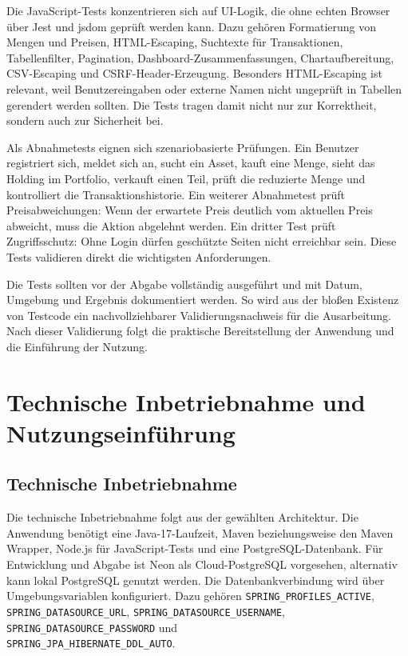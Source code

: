 \documentclass[12pt,a4paper]{article}
\begin{document}
Die JavaScript-Tests konzentrieren sich auf UI-Logik, die ohne echten Browser über Jest und jsdom geprüft werden kann. Dazu gehören Formatierung von Mengen und Preisen, HTML-Escaping, Suchtexte für Transaktionen, Tabellenfilter, Pagination, Dashboard-Zusammenfassungen, Chartaufbereitung, CSV-Escaping und CSRF-Header-Erzeugung. Besonders HTML-Escaping ist relevant, weil Benutzereingaben oder externe Namen nicht ungeprüft in Tabellen gerendert werden sollten. Die Tests tragen damit nicht nur zur Korrektheit, sondern auch zur Sicherheit bei.

Als Abnahmetests eignen sich szenariobasierte Prüfungen. Ein Benutzer registriert sich, meldet sich an, sucht ein Asset, kauft eine Menge, sieht das Holding im Portfolio, verkauft einen Teil, prüft die reduzierte Menge und kontrolliert die Transaktionshistorie. Ein weiterer Abnahmetest prüft Preisabweichungen: Wenn der erwartete Preis deutlich vom aktuellen Preis abweicht, muss die Aktion abgelehnt werden. Ein dritter Test prüft Zugriffsschutz: Ohne Login dürfen geschützte Seiten nicht erreichbar sein. Diese Tests validieren direkt die wichtigsten Anforderungen.

Die Tests sollten vor der Abgabe vollständig ausgeführt und mit Datum, Umgebung und Ergebnis dokumentiert werden. So wird aus der bloßen Existenz von Testcode ein nachvollziehbarer Validierungsnachweis für die Ausarbeitung. Nach dieser Validierung folgt die praktische Bereitstellung der Anwendung und die Einführung der Nutzung.

\newpage
\section{Technische Inbetriebnahme und Nutzungseinführung}

\subsection{Technische Inbetriebnahme}

Die technische Inbetriebnahme folgt aus der gewählten Architektur. Die Anwendung benötigt eine Java-17-Laufzeit, Maven beziehungsweise den Maven Wrapper, Node.js für JavaScript-Tests und eine PostgreSQL-Datenbank. Für Entwicklung und Abgabe ist Neon als Cloud-PostgreSQL vorgesehen, alternativ kann lokal PostgreSQL genutzt werden. Die Datenbankverbindung wird über Umgebungsvariablen konfiguriert. Dazu gehören \texttt{SPRING\_PROFILES\_ACTIVE}, \texttt{SPRING\_DATASOURCE\_URL}, \texttt{SPRING\_DATASOURCE\_USERNAME}, \texttt{SPRING\_DATASOURCE\_PASSWORD} und \\ \texttt{SPRING\_JPA\_HIBERNATE\_DDL\_AUTO}.
\end{document}
